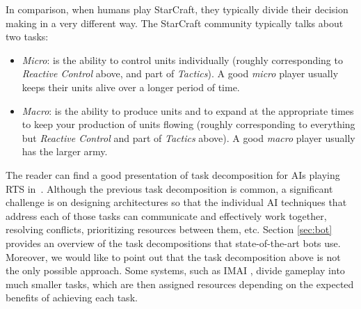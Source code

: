 \documentclass{llncs}
\begin{document}
In comparison, when humans play StarCraft, they typically divide their
decision  making in  a  very different  way.  The StarCraft  community
typically talks about two tasks:
\begin{itemize}
\item  {\em  Micro}: is  the  ability  to control  units  individually
  (roughly corresponding to {\em Reactive  Control} above, and part of
  {\em Tactics}). A good \emph{micro} player usually keeps their units
  alive over a longer period of time.
\item {\em  Macro}: is the ability  to produce units and  to expand at
  the  appropriate times  to  keep your  production  of units  flowing
  (roughly corresponding to everything  but {\em Reactive Control} and
  part of {\em Tactics} above). A good \emph{macro} player usually has
  the larger army.
\end{itemize}

The reader can find a good  presentation of task decomposition for AIs
playing  RTS   in~\cite{weber2011acs}.  Although  the   previous  task
decomposition  is  common, a  significant  challenge  is on  designing
architectures so that  the individual AI techniques  that address each
of  those  tasks  can   communicate  and  effectively  work  together,
resolving conflicts, prioritizing resources between them, etc. Section
\ref{sec:bot}  provides an  overview of  the task  decompositions that
state-of-the-art bots use.  Moreover, we would like to  point out that
the task decomposition  above is not the only  possible approach. Some
systems, such  as IMAI  \cite{miles2007co}, divide gameplay  into much
smaller  tasks, which  are then  assigned resources  depending on  the
expected benefits of achieving each task.




\end{document}
